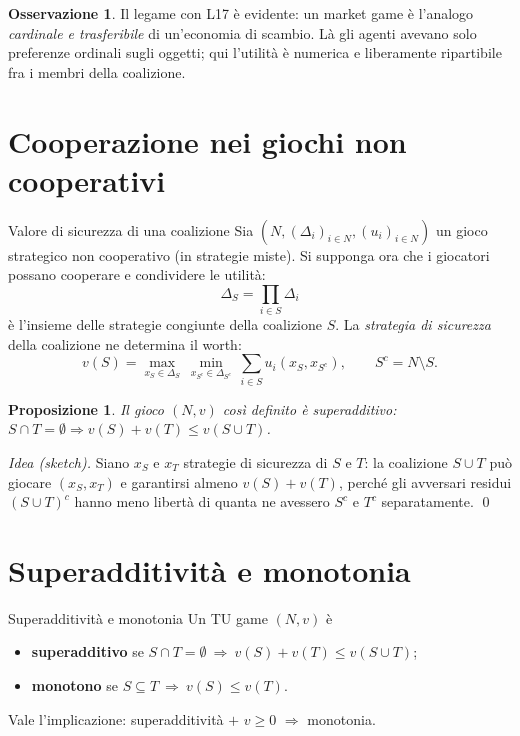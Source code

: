 \documentclass[12pt,a4paper,twoside]{book}
\theoremstyle{plain}
\newtheorem{proposition}[theorem]{Proposizione}
\theoremstyle{definition}
\newtheorem{remark}[theorem]{Osservazione}
\begin{document}
\begin{remark}
Il legame con L17 è evidente: un market game è l'analogo \emph{cardinale e trasferibile} di un'economia di scambio. Là gli agenti avevano solo preferenze ordinali sugli oggetti; qui l'utilità è numerica e liberamente ripartibile fra i membri della coalizione.
\end{remark}

\section{Cooperazione nei giochi non cooperativi}

\begin{defbox}{Valore di sicurezza di una coalizione}
Sia $(N,(\Delta_i)_{i\in N},(u_i)_{i\in N})$ un gioco strategico non cooperativo (in strategie miste). Si supponga ora che i giocatori possano cooperare e condividere le utilità:
\[ \Delta_S=\prod_{i\in S}\Delta_i \]
è l'insieme delle strategie congiunte della coalizione $S$. La \emph{strategia di sicurezza} della coalizione ne determina il worth:
\[ v(S)=\max_{x_S\in\Delta_S}\ \min_{x_{S^c}\in\Delta_{S^c}}\ \sum_{i\in S}u_i(x_S,x_{S^c}),\qquad S^c=N\setminus S. \]
\end{defbox}

\begin{proposition}
Il gioco $(N,v)$ così definito è superadditivo: $S\cap T=\emptyset\Rightarrow v(S)+v(T)\le v(S\cup T)$.
\end{proposition}

\textit{Idea (sketch).} Siano $x_S$ e $x_T$ strategie di sicurezza di $S$ e $T$: la coalizione $S\cup T$ può giocare $(x_S,x_T)$ e garantirsi almeno $v(S)+v(T)$, perché gli avversari residui $(S\cup T)^c$ hanno meno libertà di quanta ne avessero $S^c$ e $T^c$ separatamente. \qed

\section{Superadditività e monotonia}

\begin{defbox}{Superadditività e monotonia}
Un TU game $(N,v)$ è
\begin{itemize}
  \item \textbf{superadditivo} se $S\cap T=\emptyset\ \Rightarrow\ v(S)+v(T)\le v(S\cup T)$;
  \item \textbf{monotono} se $S\subseteq T\ \Rightarrow\ v(S)\le v(T)$.
\end{itemize}
Vale l'implicazione: superadditività $+$ $v\ge 0$ $\Rightarrow$ monotonia.
\end{defbox}
\end{document}
